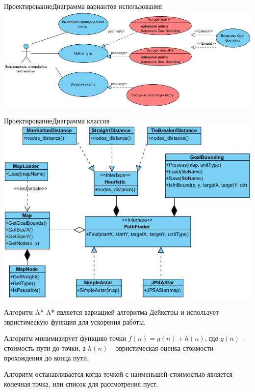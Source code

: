 \documentclass{beamer}
\begin{document}
\begin{frame}{Проектирование}{Диаграмма вариантов использования}
\centering
\includegraphics[width=1\linewidth]{path_finding_use_case.png}
\end{frame}

\begin{frame}{Проектирование}{Диаграмма классов}
\centering
\includegraphics[width=1\linewidth]{path_finding_classes.png}
\end{frame}

\begin{frame}{Алгоритм A*}{}
A* является вариацией алгоритма Дейкстры и использует эвристическую функция для ускорения работы. 

\vspace{\baselineskip}

Алгоритм минимизирует функцию точки $ f(n) = g(n) + h(n) $, где $g(n)$ -- стоимость пути до точки, а $h(n)$ -- эвристическая оценка стоимости прохождения до конца пути.

\vspace{\baselineskip}

Алгоритм останавливается когда точкой с наименьшей стоимостью является конечная точка, или список для рассмотрения пуст.
\end{frame}
\end{document}
